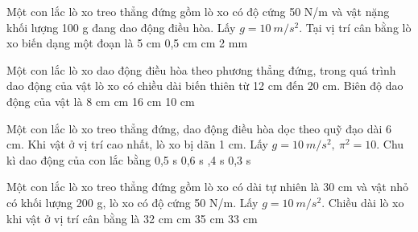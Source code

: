 \PhanI 
\begin{ex}%
Một con lắc lò xo treo thẳng đứng gồm lò xo có độ cứng 50 N/m và vật nặng khối lượng 100 g đang dao động điều hòa. Lấy $g = 10\ m/s^2$. Tại vị trí cân bằng lò xo biến dạng một đoạn là
\choice
{5 cm}
{0,5 cm}
{ cm}
{2 mm}
\end{ex} 
\begin{ex}%
Một con lắc lò xo dao động điều hòa theo phương thẳng đứng, trong quá trình dao động của vật lò xo có chiều dài biến thiên từ 12 cm đến 20 cm. Biên độ dao động của vật là
\choice
{8 cm}
{ cm}
{16 cm}
{10 cm}
\end{ex} 

\begin{ex}%
Một con lắc lò xo treo thẳng đứng, dao động điều hòa dọc theo quỹ đạo dài 6 cm. Khi vật ở vị trí cao nhất, lò xo bị dãn 1 cm. Lấy $g = 10\ m/s^2,\ \pi^2 = 10$. Chu kì dao động của con lắc bằng
\choice
{0,5 s}
{0,6 s}
{,4 s}
{0,3 s}
\end{ex} 

\begin{ex}%
Một con lắc lò xo treo thẳng đứng gồm lò xo có dài tự nhiên là 30 cm và vật nhỏ có khối lượng 200 g, lò xo có độ cứng 50 N/m. Lấy $g = 10\ m/s^2$. Chiều dài lò xo khi vật ở vị trí cân bằng là
\choice
{32 cm}
{ cm}
{35 cm}
{33 cm}
\end{ex} 

